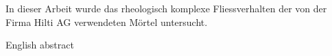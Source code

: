 \thispagestyle{empty}
\begin{abstr}
In dieser Arbeit wurde das rheologisch komplexe Fliessverhalten der von der Firma Hilti AG verwendeten Mörtel untersucht. 
\end{abstr}


\begin{abstr}
English abstract
\end{abstr}
